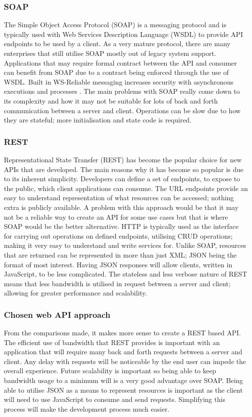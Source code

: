 \subsubsection*{SOAP}
The Simple Object Access Protocol (SOAP) is a messaging protocol and is typically used with Web Services Description Language (WSDL) to 
provide API endpoints to be used by a client.
As a very mature protocol, there are many enterprises that still utilise SOAP mostly out of legacy system support. 
Applications that may require formal contract between the API and consumer can benefit from SOAP due to a contract being enforced through 
the use of WSDL. Built in WS-Reliable messaging increases security with asynchronous executions and processes \cite{claire2015restvssoap}.
The main problems with SOAP really come down to its complexity and how it may not be suitable for lots of back and forth communication
between a server and client. Operations can be slow due to how they are stateful; more initialisation and state code is required.

\subsubsection*{REST}
Representational State Transfer (REST) has become the popular choice for new APIs that are developed.
The main reasons why it has become so popular is due to its inherent simplicity. 
Developers can define a set of endpoints, to expose to the public, which client applications can consume. 
The URL endpoints provide an easy to understand representation of what resources can be accessed; nothing extra is publicly available.
A problem with this approach would be that it may not be a reliable way to create an API for some use cases but that is where SOAP
would be the better alternative.
HTTP is typically used as the interface for carrying out operations on defined endpoints, utilising CRUD operations; making it very easy 
to understand and write services for.
Unlike SOAP, resources that are returned can be represented in more than just XML; JSON being the format of most interest. 
Having JSON responses will allow clients, written in JavaScript, to be less complicated.
The stateless and less verbose nature of REST means that less bandwidth is utilised in request between a server and client; allowing
for greater performance and scalability.

\subsubsection*{Chosen web API approach}
From the comparisons made, it makes more sense to create a REST based API.
The efficient use of bandwidth that REST provides is important with an application that will require many back and forth requests
between a server and client. Any delay with requests will be noticeable by the end user can impede the overall experience.
Future scalability is important so being able to keep bandwidth usage to a minimum will is a very good advantage over SOAP.
Being able to utilise JSON as a means to represent resources is important as the client will need to use JavaScript to consume and 
send requests. Simplifying this process will make the development process much easier.


